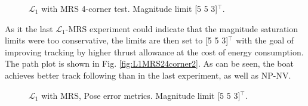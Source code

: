 \begin{figure}[!h]
    \centering
    \caption{$\mathcal{L}_1$ with MRS 4-corner test. Magnitude limit [5 5 3]$^\top{}$.}
\end{figure}\label{fig:L1MRS24corner2}

As it the last $\mathcal{L}_1$-MRS experiment could indicate that the magnitude saturation limits were too conservative, the limits are then set to [5 5 3]$^\top{}$ with the goal of improving tracking by higher thrust allowance at the cost of energy consumption. The path plot is shown in Fig. \ref{fig:L1MRS24corner2}. As can be seen, the boat achieves better track following than in the last experiment, as well as NP-NV. 

\begin{figure}[!h]
    \centering
    \caption{$\mathcal{L}_1$ with MRS, Pose error metrics. Magnitude limit [5 5 3]$^\top{}$.}
\end{figure}\label{fig:L1MRS2metric2}

